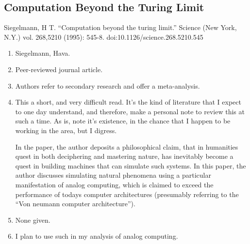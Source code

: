 \subsection*{Computation Beyond the Turing Limit}
Siegelmann, H T. “Computation beyond the turing limit.” Science (New York, N.Y.) vol. 268,5210 (1995): 545-8. doi:10.1126/science.268.5210.545
\begin{enumerate}
    \item Siegelmann, Hava.
    \item Peer-reviewed journal article.
    \item Authors refer to secondary research and offer a meta-analysis.
    \item This a short, and very difficult read. It's the kind of literature that I expect to one day understand, and therefore, make a personal note to review this at such a time. As is, note it's existence, in the chance that I happen to be working in the area, but I digress.
    
    In the paper, the author deposits a philosophical claim, that in humanities quest in both deciphering and mastering nature, has inevitably become a quest in building machines that can simulate such systems. In this paper, the author discusses simulating natural phenomena using a particular manifestation of analog computing, which is claimed to exceed the performance of todays computer architectures (presumably referring to the ``Von neumann computer architecture''). 
    \item None given. 
    \item I plan to use such in my analysis of analog computing. 
\end{enumerate}



